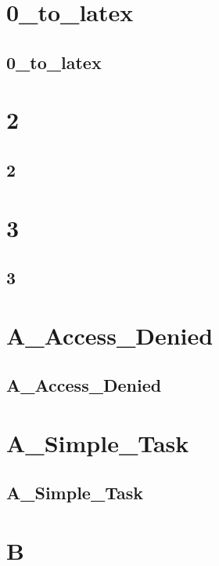 \section{0\_to\_latex}
\subsection{0\_to\_latex}
\raggedbottom
\hrulefill

\section{2}
\subsection{2}
\raggedbottom
\hrulefill

\section{3}
\subsection{3}
\raggedbottom
\hrulefill

\section{A\_Access\_Denied}
\subsection{A\_Access\_Denied}
\raggedbottom
\hrulefill

\section{A\_Simple\_Task}
\subsection{A\_Simple\_Task}
\raggedbottom
\hrulefill

\section{B}

